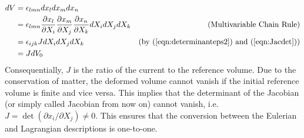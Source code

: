 \begin{align}
dV &= \epsilon_{lmn} dx_ldx_mdx_n \nonumber \\
&= \epsilon_{lmn} \frac{\partial x_l}{\partial X_i}\frac{\partial x_m}{\partial X_j}\frac{\partial x_n}{\partial X_k} dX_idX_jdX_k & \text{(Multivariable Chain Rule)} \nonumber \\
&= \epsilon_{ijk} J dX_idX_jdX_k & \text{(by (\ref{eqn:determinanteps2}) and (\ref{eqn:Jacdet}))} \nonumber \\
&= J dV_0 \label{eqn:dVJdV_0}
\end{align}
Consequentially, $J$ is the ratio of the current to the reference volume. Due to the conservation of matter, the deformed volume cannot vanish if the initial reference volume is finite and vice versa. This implies that the determinant of the Jacobian (or simply called Jacobian from now on) cannot vanish, i.e.\ $J = \det(\partial x_i/\partial X_j) \neq 0$. This ensures that the conversion between the Eulerian and Lagrangian descriptions is one-to-one.\par

